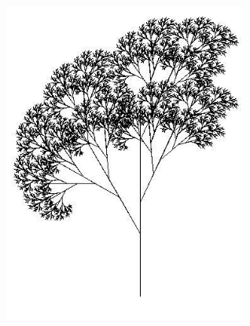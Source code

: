 \documentclass[rgb]{beamer}
\begin{document}
\begin{frame}[fragile]
\begin{footnotesize}
\begin{minipage}[c]{0.4\textwidth}
\vspace{1ex}

\mbox{ }\hfill\includegraphics[width=0.6\textwidth]{../images/RecursiveTree.JPG}
\end{minipage}

\end{footnotesize}
\end{frame}
\end{document}
